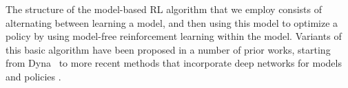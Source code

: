 The structure of the model-based RL algorithm that we employ consists of alternating between learning a model, and then using this model to optimize a policy by using model-free reinforcement learning within the model. Variants of this basic algorithm have been proposed in a number of prior works, starting from Dyna~\cite{dyna} to more recent methods that incorporate deep networks for models and policies
\cite{stochastic_value_gradients, model_based_value_estimation, uncertainty_driven_imagination, trpo_ensemble}. 


